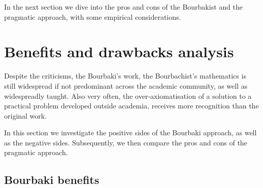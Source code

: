 \documentclass[]{scrartcl}
\theoremstyle{definition}
\begin{document}


In the next section we dive into the pros and cons of the Bourbakist and the pragmatic approach, with some empirical considerations.

\section{Benefits and drawbacks analysis}

Despite the criticisms, the Bourbaki's work, the Bourbachist's mathematics is still widespread if not predominant across the academic community, as well as widespreadly taught.
Also very often, the over-axiomatisation of a solution to a practical problem developed outside academia, receives more recognition than the original work.


In this section we investigate the positive sides of the Bourbaki approach, as well as the negative sides. Subsequently, we then compare the pros and cons of the pragmatic approach.

\subsection*{Bourbaki benefits}
\end{document}
